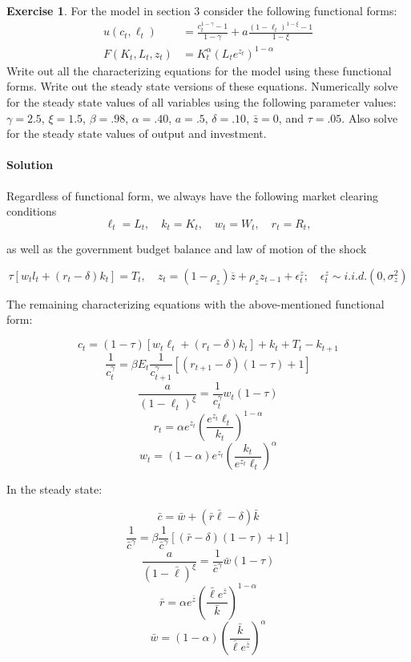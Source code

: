 \documentclass[letterpaper,12pt]{article}
\theoremstyle{definition}
\newtheorem{exercise}[theorem]{Exercise}
\begin{document}
\begin{spacing}{1.5}
	\begin{exercise} \label{DSGE_HW_CES}
		For the model in section 3 consider the following functional forms:
		\begin{equation}\label{DSGE_HW_CES_eq01}
		\begin{split}
		u(c_t,\ell_t) & = \frac{c^{1-\gamma}_t -1}{1-\gamma}+ a \frac{(1-\ell_t)^{1-\xi}-1}{1-\xi}      \\
		F(K_t,L_t,z_t) & = K^{\alpha}_t (L_te^{z_t})^{1-\alpha}  \nonumber
		\end{split}
		\end{equation}
		Write out all the characterizing equations for the model using these functional forms.  {}Write out the steady state versions of these equations.  Numerically solve for the steady state values of all variables using the following parameter values: $\gamma = 2.5$, $\xi = 1.5$,  $\beta = .98$, $\alpha = .40$, $a=.5$, $\delta = .10$, $\bar z = 0$, and $\tau = .05$.  Also solve for the steady state values of output and investment.
	\end{exercise}

\paragraph{Solution} Regardless of functional form, we always have the following market clearing conditions
$$\ell_t = L_t, \quad k_t = K_t, \quad w_t = W_t, \quad r_t = R_t ,$$

as well as the government budget balance and law of motion of the shock

$$ \tau [w_tl_t + (r_t - \delta)k_t] = T_t, \quad z_t = ( 1 - \rho_z )\overline{z} + \rho_z z_{t - 1} + \epsilon_t^z; \quad \epsilon_t^z \sim i.i.d.(0, \sigma_z^2)$$

The remaining characterizing equations with the above-mentioned functional form:

$$c_t = (1 - \tau)[w_t\ell_t + (r_t - \delta) k_t] + k_t + T_t - k_{t + 1} $$
$$\frac{1}{c_t^\gamma} = \beta E_t{\frac{1}{c_{t + 1}^\gamma} [ (r_{t + 1} -\delta)(1 - \tau) + 1]} $$
$$ \frac{a}{(1 - \ell_t)^\xi} = \frac{1}{c_t^\gamma} w_t (1 - \tau) $$
$$r_t = \alpha e^{z_t} (\frac{ e^{z_t} \ell_t}{k_t})^{1 - \alpha} $$
$$w_t = (1 - \alpha) e^{z_t} (\frac{k_t}{e^{z_t} \ell_t})^\alpha$$

In the steady state:


$$\bar{c} = \bar{w} + (\bar{r}\bar{\ell} - \delta) \bar{k}$$
$$\frac{1}{\bar{c}^\gamma} = \beta {\frac{1}{\bar{c}^\gamma} [(\bar{r} -\delta)(1 - \tau) + 1]} $$
$$ \frac{a}{(1 - \bar{\ell})^\xi} = \frac{1}{\bar{c}^\gamma} \bar{w} (1 - \tau) $$
$$\bar{r} = \alpha e^{\bar{z}} (\frac{\bar{\ell}e^{\bar{z}}}{\bar{k}})^{1 - \alpha} $$
$$\bar{w} = (1 - \alpha) (\frac{\bar{k}}{\bar{\ell}e^{\bar{z}}})^\alpha$$


\end{spacing}
\end{document}
